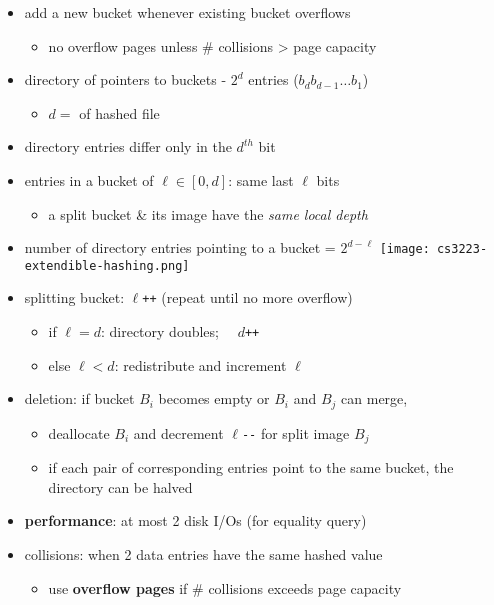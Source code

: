 \documentclass[10pt, landscape]{article}
\begin{document}
\begin{multicols*}{4}
  \begin{itemize}
    \item add a new bucket whenever existing bucket overflows 
      \begin{itemize}
        \item no overflow pages unless \# collisions > page capacity 
      \end{itemize}
    \item directory of pointers to buckets - $2^d$ entries ($b_db_{d-1}\dots b_1$)
      \begin{itemize}
        \item $d=$  of hashed file
      \end{itemize}
    \item {} directory entries differ only in the $d^{th}$ bit
    \item entries in a bucket of  $\ell \in [0,d]$: same last $\ell$ bits
      \begin{itemize}
        \item a split bucket \& its image have the \textit{same local depth}
      \end{itemize}
    \item number of directory entries pointing to a bucket = $2^{d-\ell}$
      \texttt{[image: cs3223-extendible-hashing.png]} 
    \item splitting bucket: $\ell$\texttt{++} (repeat until no more overflow)
      \begin{itemize}
        \item if $\ell = d$: directory doubles; $\quad d$\texttt{++}
        \item else $\ell < d$: redistribute and increment $\ell$
      \end{itemize}
    \item deletion: if bucket $B_i$ becomes empty or $B_i$ and $B_j$ can merge,
      \begin{itemize}
        \item deallocate $B_i$ and decrement $\ell$\texttt{-{}-} for split image $B_j$
        \item if each pair of corresponding entries point to the same bucket, the directory can be halved
      \end{itemize}
    \item \textbf{performance}: at most 2 disk I/Os (for equality query)
    \item collisions: when 2 data entries have the same hashed value
      \begin{itemize}
        \item use \textbf{overflow pages} if \# collisions exceeds page capacity
      \end{itemize}
  \end{itemize}


\end{multicols*}
\end{document}
